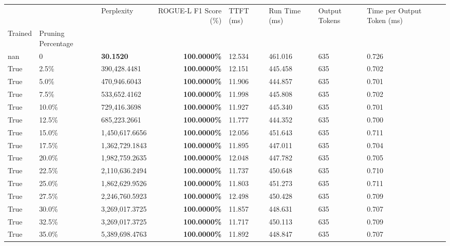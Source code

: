 \begin{table}[H]
\label{tab:evaluation-pipeline-9-trained}
\begin{tabular}{lllrllll}
\toprule
 &  & Perplexity & ROGUE-L F1 Score (\%) & TTFT (ms) & Run Time (ms) & Output Tokens & Time per Output Token (ms) \\
Trained & Pruning Percentage &  &  &  &  &  &  \\
\midrule
nan & 0 & \bfseries 30.1520 & \bfseries 100.0000\% & 12.534 & 461.016 & 635 & 0.726 \\
\cline{1-8}
True & 2.5\% & 390,428.4481 & \bfseries \color{red} 100.0000\% & 12.151 & 445.458 & 635 & 0.702 \\
\cline{1-8}
True & 5.0\% & 470,946.6043 & \bfseries \color{red} 100.0000\% & 11.906 & 444.857 & 635 & 0.701 \\
\cline{1-8}
True & 7.5\% & 533,652.4162 & \bfseries \color{red} 100.0000\% & 11.998 & 445.808 & 635 & 0.702 \\
\cline{1-8}
True & 10.0\% & 729,416.3698 & \bfseries \color{red} 100.0000\% & 11.927 & 445.340 & 635 & 0.701 \\
\cline{1-8}
True & 12.5\% & 685,223.2661 & \bfseries \color{red} 100.0000\% & 11.777 & 444.352 & 635 & 0.700 \\
\cline{1-8}
True & 15.0\% & 1,450,617.6656 & \bfseries \color{red} 100.0000\% & 12.056 & 451.643 & 635 & 0.711 \\
\cline{1-8}
True & 17.5\% & 1,362,729.1843 & \bfseries \color{red} 100.0000\% & 11.895 & 447.011 & 635 & 0.704 \\
\cline{1-8}
True & 20.0\% & 1,982,759.2635 & \bfseries \color{red} 100.0000\% & 12.048 & 447.782 & 635 & 0.705 \\
\cline{1-8}
True & 22.5\% & 2,110,636.2494 & \bfseries \color{red} 100.0000\% & 11.737 & 450.648 & 635 & 0.710 \\
\cline{1-8}
True & 25.0\% & 1,862,629.9526 & \bfseries \color{red} 100.0000\% & 11.803 & 451.273 & 635 & 0.711 \\
\cline{1-8}
True & 27.5\% & 2,246,760.5923 & \bfseries \color{red} 100.0000\% & 12.498 & 450.428 & 635 & 0.709 \\
\cline{1-8}
True & 30.0\% & 3,269,017.3725 & \bfseries \color{red} 100.0000\% & 11.857 & 448.631 & 635 & 0.707 \\
\cline{1-8}
True & 32.5\% & 3,269,017.3725 & \bfseries \color{red} 100.0000\% & 11.717 & 450.113 & 635 & 0.709 \\
\cline{1-8}
True & 35.0\% & 5,389,698.4763 & \bfseries \color{red} 100.0000\% & 11.892 & 448.847 & 635 & 0.707 \\

\end{tabular}
\end{table}
